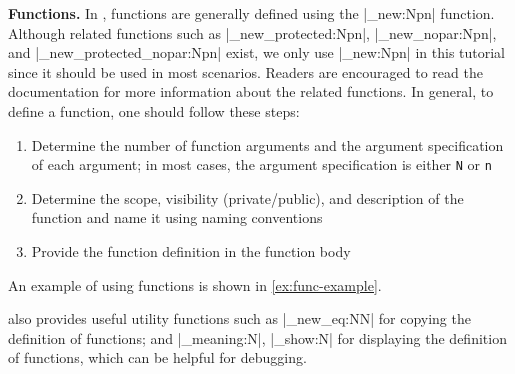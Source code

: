\documentclass{ltugboat}
\begin{document}
\par\medskip\noindent\textbf{Functions.}
In \LTT{}, functions are generally defined using the \inltex|\cs_new:Npn| function.
Although related functions such as \inltex|\cs_new_protected:Npn|, \inltex|\cs_new_nopar:Npn|, and \inltex|\cs_new_protected_nopar:Npn| exist, we only use \inltex|\cs_new:Npn| in this tutorial since it should be used in most scenarios. 
Readers are encouraged to read the \LTT{} documentation for more information about the related functions.
In general, to define a function, one should follow these steps:
\begin{enumerate}
    \item Determine the number of function arguments and the argument specification of each argument; in most cases, the argument specification is either \verb|N| or \verb|n|
    \item Determine the scope, visibility (private/public), and description of the function and name it using \LTT{} naming conventions
    \item Provide the function definition in the function body
\end{enumerate}
An example of using functions is shown in \cref{ex:func-example}.



\LTT{} also provides useful utility functions such as \inltex|\cs_new_eq:NN| for copying the definition of functions; and \inltex|\cs_meaning:N|, \inltex|\cs_show:N| for displaying the definition of functions, which can be helpful for debugging.

\end{document}

